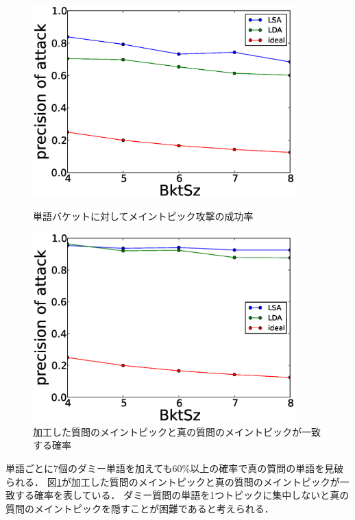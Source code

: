 \documentclass[master]{suribt}
\theoremstyle{definition}
\begin{document}
 \begin{figure}
 \begin{minipage}[t]{0.5\linewidth}
 \centering
 \includegraphics[width=0.9\textwidth]{ETSQ1.eps}
 \vspace{5em}
 \caption{単語バケットに対してメイントピック攻撃の成功率}
 \label{fig:mt1}
 \end{minipage}%
 \begin{minipage}[t]{0.5\linewidth}
 \centering
 \includegraphics[width=0.9\textwidth]{ETSQ2.eps}
 \vspace{5em}
 \caption{加工した質問のメイントピックと真の質問のメイントピックが一致する確率}
 \label{fig:mt2}
 \end{minipage}
 \end{figure}
 
 単語ごとに$7$個のダミー単語を加えても$60\%$以上の確率で真の質問の単語を見破られる．
 図\ref{fig:mt2}が加工した質問のメイントピックと真の質問のメイントピックが一致する確率を表している．
 ダミー質問の単語を1つトピックに集中しないと真の質問のメイントピックを隠すことが困難であると考えられる．
 
\end{document}

